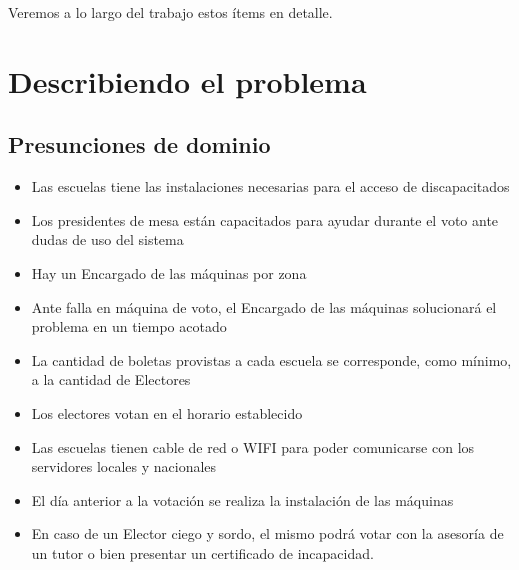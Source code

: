 \documentclass[spanish, 10pt,a4paper]{article}
\numberwithin{equation}{section} %
\begin{document}
	Veremos a lo largo del trabajo estos ítems en detalle.
	
\newpage
\section{Describiendo el problema}

\subsection{Presunciones de dominio}
\begin{itemize}
\item Las escuelas tiene las instalaciones necesarias para el acceso de discapacitados
\item Los presidentes de mesa están capacitados para ayudar durante el voto ante dudas de uso del sistema
\item Hay un Encargado de las máquinas por zona
\item Ante falla en máquina de voto, el Encargado de las máquinas solucionará el problema en un tiempo acotado
\item La cantidad de boletas provistas a cada escuela se corresponde, como mínimo, a la cantidad de Electores
\item Los electores votan en el horario establecido
\item Las escuelas tienen cable de red o WIFI para poder comunicarse con los servidores locales y nacionales
\item El día anterior a la votación se realiza la instalación de las máquinas 
\item En caso de un Elector ciego y sordo, el mismo podrá votar con la asesoría de un tutor o bien presentar un certificado de incapacidad.
\end{itemize}
\end{document}
